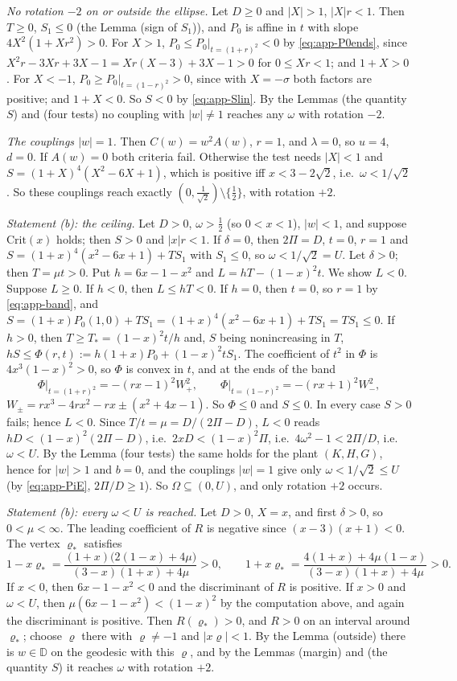 \documentclass[11pt,reqno]{amsart}
\theoremstyle{plain}
\theoremstyle{definition}
\theoremstyle{remark}
\newcommand{\Crit}{\mathrm{Crit}}
\begin{document}
\medskip\noindent\emph{No rotation $-2$ on or outside the ellipse.}
Let $D\ge0$ and $|X|>1$, $|X|r<1$. Then $T\ge0$, $S_1\le0$ (the Lemma (sign of $S_1$)), and $P_0$ is affine in $t$
with slope $4X^{2}(1+Xr^{2})>0$. For $X>1$, $P_0\le P_0|_{t=(1+r)^{2}}<0$ by \eqref{eq:app-P0ends}, since
$X^{2}r-3Xr+3X-1=Xr(X-3)+3X-1>0$ for $0\le Xr<1$; and $1+X>0$. For $X<-1$, $P_0\ge P_0|_{t=(1-r)^{2}}>0$,
since with $X=-\sigma$ both factors are positive; and $1+X<0$. So $S<0$ by \eqref{eq:app-Slin}. By
the Lemmas (the quantity $S$) and (four tests) no coupling with $|w|\ne1$ reaches any $\omega$ with rotation $-2$.

\medskip\noindent\emph{The couplings $|w|=1$.}
Then $C(w)=w^{2}A(w)$, $r=1$, and $\lambda=0$, so $u=4$, $d=0$. If $A(w)=0$ both criteria fail. Otherwise the
test needs $|X|<1$ and $S=(1+X)^{4}(X^{2}-6X+1)$, which is positive iff $x<3-2\sqrt2$, i.e.\
$\omega<1/\sqrt2$. So these couplings reach exactly $(0,\frac1{\sqrt2})\setminus\{\frac12\}$, with rotation $+2$.

\medskip\noindent\emph{Statement (b): the ceiling.}
Let $D>0$, $\omega>\frac12$ (so $0<x<1$), $|w|<1$, and suppose $\Crit(x)$ holds; then $S>0$ and
$|x|r<1$. If $\delta=0$, then $2\Pi=D$, $t=0$, $r=1$ and $S=(1+x)^{4}(x^{2}-6x+1)+TS_1$ with $S_1\le0$, so
$\omega<1/\sqrt2=U$. Let $\delta>0$; then $T=\mu t>0$.
Put $h=6x-1-x^{2}$ and $L=hT-(1-x)^{2}t$. We show $L<0$. Suppose $L\ge0$.
If $h<0$, then $L\le hT<0$. If $h=0$, then $t=0$, so $r=1$ by \eqref{eq:app-band}, and
$S=(1+x)P_0(1,0)+TS_1=(1+x)^{4}(x^{2}-6x+1)+TS_1=TS_1\le0$. If $h>0$, then
$T\ge T_*=(1-x)^{2}t/h$ and, $S$ being nonincreasing in $T$, $hS\le\Phi(r,t):=h(1+x)P_0+(1-x)^{2}tS_1$. The
coefficient of $t^{2}$ in $\Phi$ is $4x^{3}(1-x)^{2}>0$, so $\Phi$ is convex in $t$, and at the ends of the band
\[
  \Phi\big|_{t=(1+r)^{2}}=-(rx-1)^{2}W_+^{2},\qquad \Phi\big|_{t=(1-r)^{2}}=-(rx+1)^{2}W_-^{2},
\]
$W_\pm=rx^{3}-4rx^{2}-rx\pm(x^{2}+4x-1)$. So $\Phi\le0$ and $S\le0$. In every case $S>0$ fails; hence $L<0$.
Since $T/t=\mu=D/(2\Pi-D)$, $L<0$ reads $hD<(1-x)^{2}(2\Pi-D)$, i.e.\ $2xD<(1-x)^{2}\Pi$, i.e.\
$4\omega^{2}-1<2\Pi/D$, i.e.\ $\omega<U$. By the Lemma (four tests) the same holds for the plant $(K,H,G)$,
hence for $|w|>1$ and $b=0$, and the couplings $|w|=1$ give only $\omega<1/\sqrt2\le U$ (by \eqref{eq:app-PiE},
$2\Pi/D\ge1$). So $\Omega\subseteq(0,U)$, and only rotation $+2$ occurs.

\medskip\noindent\emph{Statement (b): every $\omega<U$ is reached.}
Let $D>0$, $X=x$, and first $\delta>0$, so $0<\mu<\infty$. The leading coefficient of $R$ is negative
since $(x-3)(x+1)<0$. The vertex $\varrho_*$ satisfies
\[
  1-x\varrho_*=\frac{(1+x)\bigl(2(1-x)+4\mu\bigr)}{(3-x)(1+x)+4\mu}>0,\qquad
  1+x\varrho_*=\frac{4(1+x)+4\mu(1-x)}{(3-x)(1+x)+4\mu}>0 .
\]
If $x<0$, then $6x-1-x^{2}<0$ and the discriminant of $R$ is positive. If $x>0$ and $\omega<U$, then
$\mu(6x-1-x^{2})<(1-x)^{2}$ by the computation above, and again the discriminant is positive. Then
$R(\varrho_*)>0$, and $R>0$ on an interval around $\varrho_*$; choose $\varrho$ there with $\varrho\ne-1$ and
$|x\varrho|<1$. By the Lemma (outside) there is $w\in\mathbb D$ on the geodesic with this $\varrho$, and by
the Lemmas (margin) and (the quantity $S$) it reaches $\omega$ with rotation $+2$.
\end{document}
